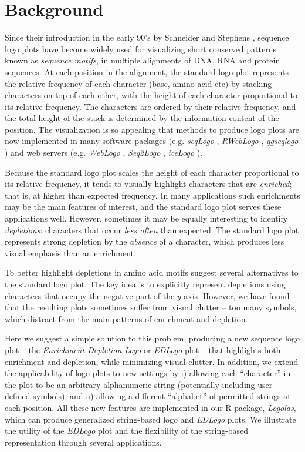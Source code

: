 \documentclass{bmcart}
\begin{document}
\section*{Background}

Since their introduction in the early 90's by Schneider and Stephens \cite{Schneider1990}, sequence logo plots have become widely used for visualizing short conserved patterns known as \textit{sequence motifs}, in multiple alignments of DNA, RNA and protein sequences. At each position in the alignment, the standard logo plot represents the relative frequency of each character (base, amino acid etc) by stacking characters on top of each other, with the height of each character proportional to its relative frequency. The characters are ordered by their relative frequency, and the total height of the stack is determined by the information content of the position. The visualization is so appealing that methods to produce logo plots are now implemented in many software packages (e.g. \textit{seqLogo} \cite{Bembom2017}, \textit{RWebLogo} \cite{Wagih2014}, \textit{ggseqlogo}  \cite{Wagih2017})  and  web servers (e.g. \textit{WebLogo} \cite{Crooks2004}, \textit{Seq2Logo} \cite{Thomsen2012}, \textit{iceLogo}  \cite{Coalert2009}). 

Because the standard logo plot scales the height of each character proportional to its relative frequency, it tends to visually highlight characters that are {\it enriched}; that is, at higher than expected frequency. In many applications such enrichments may be the main features
of interest, and the standard logo plot serves these applications well. 
However, sometimes it may be equally interesting
to identify {\it depletions}: characters that occur {\it less often} than expected.
The standard logo plot represents strong depletion by the {\it absence} of a character, which produces less visual emphasis than an enrichment.

To better highlight depletions in amino acid motifs \cite{Thomsen2012} suggest several alternatives to the standard logo plot. The key idea is to explicitly represent depletions using characters that occupy the negative part of the $y$ axis. However, we have found that the resulting plots sometimes suffer from visual clutter -- too many symbols, which distract from the main patterns of enrichment and depletion. 

Here we suggest a simple solution to this problem, 
producing a new sequence logo plot -- the \textit{Enrichment Depletion Logo} or \textit{EDLogo} plot -- that highlights both enrichment and depletion, while minimizing visual clutter. In addition, we extend
the applicability of logo plots to new settings by i) allowing each ``character'' in the plot
to be an arbitrary alphanumeric string (potentially including user-defined symbols);
and ii) allowing a different ``alphabet'' of permitted strings at each position. All these new features are implemented in our
R package, \textit{Logolas}, which can produce
generalized string-based logo and \textit{EDLogo} plots.
 We illustrate the utility of the \textit{EDLogo} plot and the flexibility of the string-based representation through several applications. 
\end{document}

